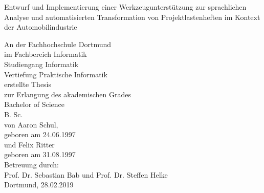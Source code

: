\documentclass[12pt]{report}
\begin{document}
\begin{titlepage}
\raggedright
\begin{large}
Entwurf und Implementierung einer Werkzeugunterstützung zur sprachlichen Analyse und automatisierten Transformation von Projektlastenheften im Kontext der Automobilindustrie
\end{large}

\vfill\vfill\vfill\vfill
An der Fachhochschule Dortmund\\
\vfill
im Fachbereich Informatik\\
\vfill
Studiengang Informatik\\
\vfill
Vertiefung Praktische Informatik\\
\vfill
erstellte Thesis\\
\vfill\vfill\vfill\vfill
zur Erlangung des akademischen Grades\\
\vfill
Bachelor of Science\\
\vfill
B. Sc.\\
\vfill\vfill\vfill\vfill
von Aaron Schul, \\
\vfill
geboren am 24.06.1997\\
\vfill
und Felix Ritter\\
\vfill
geboren am 31.08.1997\\
\vfill\vfill
Betreuung durch:\\
\vfill
Prof. Dr. Sebastian Bab und Prof. Dr. Steffen Helke\\
\vfill
Dortmund, 28.02.2019\\
\end{titlepage}
\end{document}
